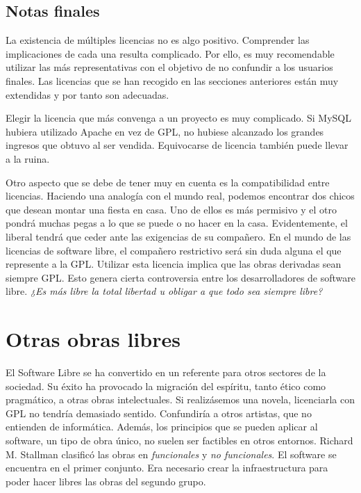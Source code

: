 \subsection{Notas finales}

La existencia de múltiples licencias no es algo positivo. Comprender
las implicaciones de cada una resulta complicado. Por ello, es muy
recomendable utilizar las más representativas con el objetivo de no
confundir a los usuarios finales. Las licencias que se han recogido en
las secciones anteriores están muy extendidas y por tanto son
adecuadas.

Elegir la licencia que más convenga a un proyecto es muy
complicado. Si MySQL hubiera utilizado Apache en vez de GPL, no
hubiese alcanzado los grandes ingresos que obtuvo al ser
vendida. Equivocarse de licencia también puede llevar a la ruina.

Otro aspecto que se debe de tener muy en cuenta es la compatibilidad
entre licencias. Haciendo una analogía con el mundo real, podemos
encontrar dos chicos que desean montar una fiesta en casa. Uno de
ellos es más permisivo y el otro pondrá muchas pegas a lo que se puede
o no hacer en la casa. Evidentemente, el liberal tendrá que ceder ante
las exigencias de su compañero. En el mundo de las licencias de
software libre, el compañero restrictivo será sin duda alguna el que
represente a la GPL. Utilizar esta licencia implica que las obras
derivadas sean siempre GPL. Esto genera cierta controversia entre los
desarrolladores de software libre. \emph{¿Es más libre la total
  libertad u obligar a que todo sea siempre libre?}

\section{Otras obras libres}

El Software Libre se ha convertido en un referente para otros sectores
de la sociedad. Su éxito ha provocado la migración del espíritu, tanto
ético como pragmático, a otras obras intelectuales. Si realizásemos
una novela, licenciarla con GPL no tendría demasiado
sentido. Confundiría a otros artistas, que no entienden de
informática. Además, los principios que se pueden aplicar al software,
un tipo de obra único, no suelen ser factibles en otros
entornos. Richard M. Stallman clasificó las obras en
\emph{funcionales} y \emph{no funcionales}. El software se encuentra
en el primer conjunto. Era necesario crear la infraestructura para
poder hacer libres las obras del segundo grupo.

